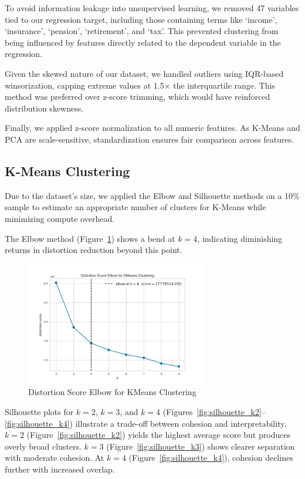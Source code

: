 \documentclass{article}
\begin{document}
To avoid information leakage into unsupervised learning, we removed 47 variables tied to our regression target, including those containing terms like ‘income’, ‘insurance’, ‘pension’, ‘retirement’, and ‘tax’. This prevented clustering from being influenced by features directly related to the dependent variable in the regression.

Given the skewed nature of our dataset, we handled outliers using IQR-based winsorization, capping extreme values at 1.5× the interquartile range. This method was preferred over z-score trimming, which would have reinforced distribution skewness.

Finally, we applied z-score normalization to all numeric features. As K-Means and PCA are scale-sensitive, standardization ensures fair comparison across features.

\subsection{K-Means Clustering}

Due to the dataset’s size, we applied the Elbow and Silhouette methods on a 10\% sample to estimate an appropriate number of clusters for K-Means while minimizing compute overhead.

The Elbow method (Figure~\ref{fig:elbow}) shows a bend at $k=4$, indicating diminishing returns in distortion reduction beyond this point.

\begin{figure}[H]
    \centering
    \includegraphics[width=0.7\textwidth]{figures/elbow_plot.png}
    \caption{Distortion Score Elbow for KMeans Clustering}
    \label{fig:elbow}
\end{figure}

Silhouette plots for $k=2$, $k=3$, and $k=4$ (Figures~\ref{fig:silhouette_k2}–\ref{fig:silhouette_k4}) illustrate a trade-off between cohesion and interpretability. $k=2$ (Figure~\ref{fig:silhouette_k2}) yields the highest average score but produces overly broad clusters. $k=3$ (Figure~\ref{fig:silhouette_k3}) shows clearer separation with moderate cohesion. At $k=4$ (Figure~\ref{fig:silhouette_k4}), cohesion declines further with increased overlap.
\end{document}
